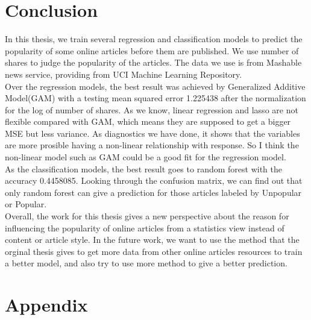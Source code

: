 \documentclass[11pt]{article}
\begin{document}
\section{Conclusion}
In this thesis, we train several regression and classification models to predict the popularity of some online articles before them are published. We use number of shares to judge the popularity of the articles. The data we use is from Mashable news service, providing from UCI Machine Learning Repository.  \\
Over the regression models, the best result was achieved by Generalized Additive Model(GAM) with a testing mean squared error 1.225438 after the normalization for the log of number of shares. As we know, linear regression and lasso are not flexible compared with GAM, which means they are supposed to get a bigger MSE but less variance. As diagnostics we have done, it shows that the variables are more prosible having a non-linear relationship with response. So I think the non-linear model such as GAM could be a good fit for the regression model. \\
As the classification models, the best result goes to random forest with the accuracy 0.4458085. Looking through the confusion matrix, we can find out that only random forest can give a prediction for those articles labeled by Unpopular or Popular.\\
Overall, the work for this thesis gives a new perspective about the reason for influencing the popularity of online articles from a statistics view instead of content or article style.
In the future work, we want to use the method that the orginal thesis gives to get more data from other online articles resources to train a better model, and also try to use more method to give a better prediction.
\section{Appendix}
\end{document}
